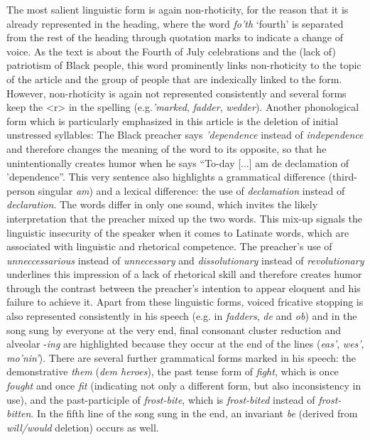 The most salient linguistic form is again non-rhoticity, for the reason that it is already represented in the heading, where the word \emph{fo’th} ‘fourth’ is separated from the rest of the heading through quotation marks to indicate a change of voice. As the text is about the Fourth of July celebrations and the (lack of) patriotism of Black people, this word prominently links non-rhoticity to the topic of the article and the group of people that are indexically linked to the form. However, non-rhoticity is again not represented consistently and several forms keep the <r> in the spelling (e.g.\emph{’marked}, \emph{fadder}, \emph{wedder}). Another phonological form which is particularly emphasized in this article is the deletion of initial unstressed syllables: The Black preacher says \emph{’dependence} instead of \emph{independence} and therefore changes the meaning of the word to its opposite, so that he unintentionally creates humor when he says “To-day [...] am de declamation of ’dependence”. This very sentence also highlights a grammatical difference (third-person singular \emph{am}) and a lexical difference: the use of \emph{declamation} instead of \emph{declaration}. The words differ in only one sound, which invites the likely interpretation that the preacher mixed up the two words. This mix-up signals the linguistic insecurity of the speaker when it comes to Latinate words, which are associated with linguistic and rhetorical competence. The preacher’s use of \emph{unneccessarious} instead of \emph{unnecessary} and \emph{dissolutionary} instead of \emph{revolutionary} underlines this impression of a lack of rhetorical skill and therefore creates humor through the contrast between the preacher’s intention to appear eloquent and his failure to achieve it. Apart from these linguistic forms, voiced fricative stopping is also represented consistently in his speech (e.g. in \emph{fadders}, \emph{de} and \emph{ob}) and in the song sung by everyone at the very end, final consonant cluster reduction and alveolar -\emph{ing} are highlighted because they occur at the end of the lines (\emph{eas’}, \emph{wes’}, \emph{mo’nin’}). There are several further grammatical forms marked in his speech: the demonstrative \emph{them} (\emph{dem heroes}), the past tense form of \emph{fight}, which is once \emph{fought} and once \emph{fit} (indicating not only a different form, but also inconsistency in use), and the past-participle of \emph{frost-bite}, which is \emph{frost-bited} instead of \emph{frost-bitten}. In the fifth line of the song sung in the end, an invariant \emph{be} (derived from \emph{will/would} deletion) occurs as well.

